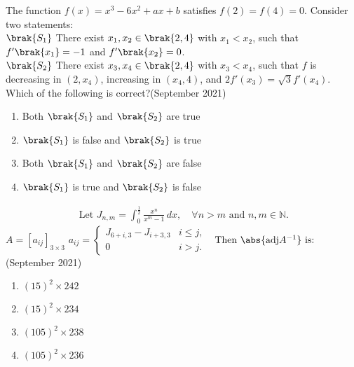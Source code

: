 \item The function $f(x) = x^3 - 6x^2 + ax + b$ satisfies $f(2) = f(4) = 0$. Consider two statements:\\[10pt]
$\brak{S_1}$ There exist $x_1, x_2 \in \brak{2, 4}$ with $x_1 < x_2$, such that $f'\brak{x_1} = -1$ and $f'\brak{x_2} = 0$.\\[10pt]
$\brak{S_2}$ There exist $x_3, x_4 \in \brak{2, 4}$ with $x_3 < x_4$, such that $f$ is decreasing in $(2, x_4)$, increasing in $(x_4, 4)$, and $2f'(x_3) = \sqrt{3}f'(x_4)$.
Which of the following is correct?\hfill (September 2021)
\begin{multicols}{2}
\begin{enumerate}
    \item Both $\brak{S_1}$ and $\brak{S_2}$  are true
    \item $\brak{S_1}$ is false and $\brak{S_2}$  is true
    \item Both $\brak{S_1}$ and $\brak{S_2}$ are false
    \item $\brak{S_1}$ is true and $\brak{S_2}$ is false
\end{enumerate}
\end{multicols}

\item \begin{align*}
\text{ Let } J_{n,m} =  \int_0^\frac{1}{2} \frac{x^n}{x^m - 1} \, dx, \quad \forall n > m \text{ and } n, m \in \mathbb{N}.
\end{align*}
 $A = [a_{ij}]_{3 \times 3}$ 
$a_{ij} = 
\begin{cases}
   J_{6+i, 3} - J_{i+3, 3} & i \leq j,\\
    0 & i > j.
    \end{cases}$
$\text{ Then } \abs{\text{adj}A^{-1}}  \text{ is:}$\hfill (September 2021)
    
\begin{multicols}{2}
\begin{enumerate}
    \item $(15)^2 \times 242$\\
    \item $(15)^2 \times 234$
    \item $(105)^2 \times 238$\\
    \item $(105)^2 \times 236$
\end{enumerate}
\end{multicols}

